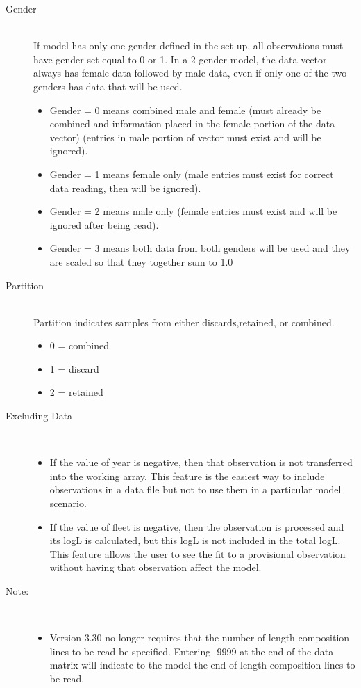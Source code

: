 \begin{description}
	\item[Gender]\hfill\\
	If model has only one gender defined in the set-up, all observations must have gender set equal to 0 or 1.  In a 2 gender model, the data vector always has female data followed by male data, even if only one of the two genders has data that will be used.
	\begin{itemize}
		\item Gender = 0 means combined male and female (must already be combined and information placed in the female portion of the data vector) (entries in male portion of vector must exist and will be ignored).
		\item Gender = 1 means female only (male entries must exist for correct data reading, then will be ignored).
		\item Gender = 2 means male only (female entries must exist and will be ignored after being read).
		\item Gender = 3 means both data from both genders will be used and they are scaled so that they together sum to 1.0
	\end{itemize}
	\item[Partition]\hfill\\
	Partition indicates samples from either discards,retained, or combined.
	\begin{itemize}
		\item 0 = combined
		\item 1 = discard
		\item 2 = retained
	\end{itemize}
	\item[Excluding Data]\
	\begin{itemize}
		\item If the value of year is negative, then that observation is not transferred into the working array.  This feature is the easiest way to include observations in a data file but not to use them in a particular model scenario.
		\item If the value of fleet is negative, then the observation is processed and its logL is calculated, but this logL is not included in the total logL.  This feature allows the user to see the fit to a provisional observation without having that observation affect the model.
	\end{itemize}
	\item[Note:]\
	\begin{itemize}
		\item Version 3.30 no longer requires that the number of length composition lines to be read be specified.  Entering -9999 at the end of the data matrix will indicate to the model the end of length composition lines to be read.

\end{itemize}
\end{description}
